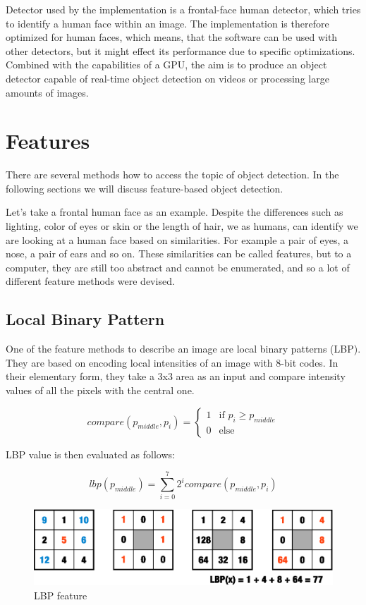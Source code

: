 Detector used by the implementation is a frontal-face human detector, which tries to identify a human face within an image. The implementation is therefore optimized for human faces, which means, that the software can be used with other detectors, but it might effect its performance due to specific optimizations. Combined with the capabilities of a GPU, the aim is to produce an object detector capable of real-time object detection on videos or processing large amounts of images.

\section{Features}

There are several methods how to access the topic of object detection. In the following sections we will discuss feature-based object detection.

Let's take a frontal human face as an example. Despite the differences such as lighting, color of eyes or skin or the length of hair, we as humans, can identify we are looking at a human face based on similarities. For example a pair of eyes, a nose, a pair of ears and so on. These similarities can be called features, but to a computer, they are still too abstract and cannot be enumerated, and so a lot of different feature methods were devised.

\subsection{Local Binary Pattern}

One of the feature methods to describe an image are local binary patterns (LBP). They are based on encoding local intensities of an image with 8-bit codes. In their elementary form, they take a 3x3 area as an input and compare intensity values of all the pixels with the central one.

\[
 compare(p_{middle},p_{i}) =
  \begin{cases}
   1 & \text{if } p_{i} \geq p_{middle} \\
   0 & \text{else}
  \end{cases}
\]

LBP value is then evaluated as follows:

\begin{equation}
lbp(p_{middle})=\sum_{i=0}^{7} 2^{i}
compare(p_{middle},p_{i})
\end{equation}


\begin{center}
\begin{figure}[h]
	\centering\includegraphics[width=12cm]{fig/lbp.eps}
	\caption{LBP feature}
\end{figure}
\end{center}

